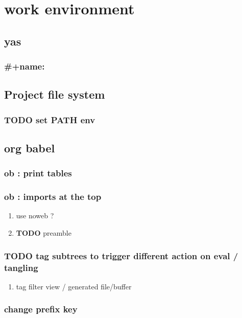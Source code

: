 \documentclass[11pt]{article}
\author{teddd}
\date{\today}
\title{}
\begin{document}
\tableofcontents

\section{work environment}
\label{sec:org5dae647}
\subsection{yas}
\label{sec:org059f6fb}
\subsubsection{\#+name:}
\label{sec:orgc090dc8}
\subsection{Project file system}
\label{sec:org28be16b}
\subsubsection{{\bfseries\sffamily TODO} set PATH env}
\label{sec:org13ae7d8}
\subsection{org babel}
\label{sec:orgf5c6fa0}
\subsubsection{ob : print tables}
\label{sec:orgb579ed9}
\subsubsection{ob : imports at the top}
\label{sec:orge9a40da}
\begin{enumerate}
\item use noweb ?
\label{sec:org37a3989}
\item {\bfseries\sffamily TODO} preamble
\label{sec:orga5e748c}
\end{enumerate}
\subsubsection{{\bfseries\sffamily TODO} tag subtrees to trigger different action on eval / tangling}
\label{sec:org7377970}
\begin{enumerate}
\item tag filter view / generated file/buffer
\label{sec:org7de0841}
\end{enumerate}
\subsubsection{change prefix key}
\label{sec:org261ecba}
\end{document}
